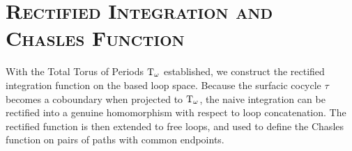 \documentclass[11pt,reqno,letterpaper,twoside]{amsart}
\begin{document}
  \section{\textsc{\textbf{Rectified Integration and Chasles Function}}}
  \label{sec:RectifiedIntegration}
  
  With the Total Torus of Periods $\mathrm{T}_\omega$ established,
  we construct the rectified integration function on the based loop space.
  Because the surfacic cocycle $\tau$ becomes a coboundary when projected to $\mathrm{T}_\omega$,
  the naive integration can be rectified into a genuine homomorphism with respect to loop concatenation.
  The rectified function is then extended to free loops,
  and used to define the Chasles function on pairs of paths with common endpoints.
  
\end{document}
